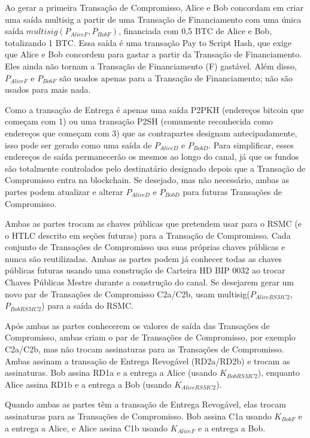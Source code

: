\documentclass[letterpaper,11pt]{article}
\begin{document}
Ao gerar a primeira Transação de Compromisso, Alice e Bob concordam em criar
uma saída multisig a partir de uma Transação de Financiamento com uma única
saída $multisig(P_{AliceF}, P_{BobF})$, financiada com 0,5 BTC de Alice e
Bob, totalizando 1 BTC. Essa saída é uma transação Pay to Script
Hash\cite{p2sh}, que exige que Alice e Bob concordem para gastar a partir da
Transação de Financiamento. Eles ainda não tornam a Transação de
Financiamento (F) gastável. Além disso, $P_{AliceF}$ e $P_{BobF}$ são usados
apenas para a Transação de Financiamento; não são usados para mais nada.

Como a transação de Entrega é apenas uma saída P2PKH (endereços bitcoin que
começam com 1) ou uma transação P2SH (comumente reconhecida como endereços
que começam com 3) que as contrapartes designam antecipadamente, isso pode
ser gerado como uma saída de $P_{AliceD}$ e $P_{BobD}$. Para simplificar,
esses endereços de saída permanecerão os mesmos ao longo do canal, já que os
fundos são totalmente controlados pelo destinatário designado depois que a
Transação de Compromisso entra na blockchain. Se desejado, mas não
necessário, ambas as partes podem atualizar e alterar $P_{AliceD}$ e
$P_{BobD}$ para futuras Transações de Compromisso.

Ambas as partes trocam as chaves públicas que pretendem usar para o RSMC
(e o HTLC descrito em seções futuras) para a Transação de Compromisso. Cada
conjunto de Transações de Compromisso usa suas próprias chaves públicas e
nunca são reutilizadas. Ambas as partes podem já conhecer todas as chaves
públicas futuras usando uma construção de Carteira HD BIP 0032\cite{bip32}
ao trocar Chaves Públicas Mestre durante a construção do canal. Se
desejarem gerar um novo par de Transações de Compromisso C2a/C2b, usam
multisig($P_{AliceRSMC2}$, $P_{BobRSMC2}$) para a saída do RSMC.

Após ambas as partes conhecerem os valores de saída das Transações de
Compromisso, ambas criam o par de Transações de Compromisso, por exemplo
C2a/C2b, mas não trocam assinaturas para as Transações de Compromisso.
Ambas assinam a transação de Entrega Revogável (RD2a/RD2b) e trocam as
assinaturas. Bob assina RD1a e a entrega a Alice (usando $K_{BobRSMC2}$),
enquanto Alice assina RD1b e a entrega a Bob (usando $K_{AliceRSMC2}$).

Quando ambas as partes têm a transação de Entrega Revogável, elas trocam
assinaturas para as Transações de Compromisso. Bob assina C1a usando
$K_{BobF}$ e a entrega a Alice, e Alice assina C1b usando $K_{AliceF}$ e a
entrega a Bob.
\end{document}
